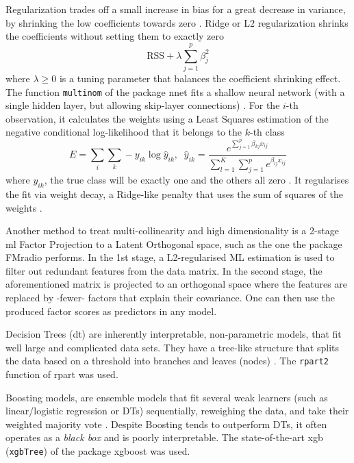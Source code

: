 \documentclass{amsart}
\begin{document}
Regularization trades off a small increase in bias for a great decrease in variance, by shrinking the low coefficients towards zero \cite{James2023AnEdition}. Ridge or L2 regularization \cite{Cessie1992RidgeRegression} shrinks the coefficients without setting them to exactly zero \cite{Cessie1992RidgeRegression}
\[\textrm{RSS} + \lambda\sum_{j=1}^{p}\beta_j^2 \]where $\lambda \geq 0$ is a tuning parameter that balances the coefficient shrinking effect. The function \texttt{multinom} of the package \textsf{nnet} fits a shallow neural network (with a single hidden layer, but allowing skip-layer connections) \cite{nnet}. For the $i$-th observation, it calculates the weights using a Least Squares estimation of the negative conditional log-likelihood that it belongs to the $k$-th class
\[E = \sum_{i}\sum_{k}-y_{ik}\log\hat{y}_{ik}, \; \;  \hat{y}_{ik} =  \dfrac{e^{\sum_{j=1}^{p}\beta_{kj}x_{ij}}}{\sum_{l=1}^{K}\sum_{j=1}^{p}e^{\beta_{lj}x_{ij}}}\]
where $y_{ik}$, the true class will be exactly one and the others all zero \cite{nnet}. It regularises the fit via weight decay, a Ridge-like penalty that uses the sum of squares of the weights \cite{nnet}.

Another method to treat multi-collinearity and high dimensionality is a 2-stage \acrfull{ml} Factor Projection to a Latent Orthogonal space, such as the one the package \textsf{FMradio} \cite{Peeters2019StableData} performs. In the 1st stage, a L2-regularised ML estimation is used to filter out redundant features from the data matrix. In the second stage, the aforementioned matrix is projected to an orthogonal space where the features are replaced by -fewer- factors that explain their covariance. One can then use the produced factor scores as predictors in any model.

Decision Trees (\acrshort{dt}) are inherently interpretable, non-parametric models, that fit well large and complicated data sets. They have a tree-like structure that splits the data based on a threshold into branches and leaves (nodes) \cite{Song2015DecisionPrediction}. The \texttt{rpart2} \cite{rpart} function of \textsf{rpart} was used.

Boosting models, are ensemble models that fit several weak learners (such as linear/logistic regression or DTs) sequentially, reweighing the data, and take their weighted majority vote \cite{Friedman2000boosting,Friedman2001gbm}. Despite Boosting tends to outperform DTs, it often operates as a \textit{black box} and is poorly interpretable. The state-of-the-art \acrlong{xgb} (\texttt{xgbTree}) of the package \textsf{xgboost} \cite{Chen2016XGBoost:System} was used.
\end{document}
